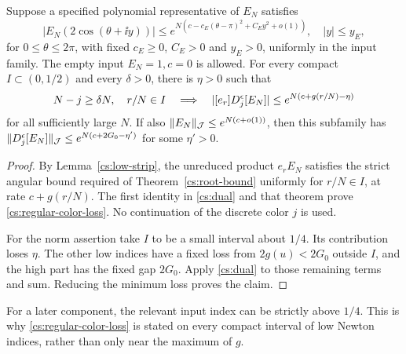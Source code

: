 \begin{proposition}\label{cs:regular-deficit}
Suppose a specified polynomial representative of $E_N$ satisfies
\begin{equation}\label{cs:E-strip}
 |E_N(2\cos(\theta+\ii y))|
 \le e^{N(c-c_E(\theta-\pi)^2+C_Ey^2+o(1))},
 \quad |y|\le y_E,
\end{equation}
for $0\le\theta\le2\pi$, with fixed $c_E\ge0$, $C_E>0$ and $y_E>0$, uniformly in the input family. The empty input \(E_N=1,c=0\) is allowed.
For every compact \(I\subset(0,1/2)\) and every \(\delta>0\),
there is \(\eta>0\) such that
\begin{equation}\label{cs:regular-color-loss}
 N-j\ge\delta N,\quad r/N\in I
 \quad\Longrightarrow\quad
 |[e_{r}]D_j^\epsilon[E_N]|
          \le e^{N(c+g(r/N)-\eta)}
\end{equation}
for all sufficiently large \(N\). If also
\(\lVert E_N\rVert_{\mathcal J}\le e^{N(c+o(1))}\), then this subfamily has
\(\lVert D_j^\epsilon[E_N]\rVert_{\mathcal J}\le e^{N(c+2G_0-\eta')}\)
for some \(\eta'>0\).
\end{proposition}
\begin{proof}
By Lemma~\ref{cs:low-strip}, the unreduced product $e_rE_N$ satisfies the strict angular bound required of Theorem~\ref{cs:root-bound}
uniformly for \(r/N\in I\), at rate \(c+g(r/N)\).
The first identity in \eqref{cs:dual} and that theorem prove
\eqref{cs:regular-color-loss}. No continuation of the discrete color
\(j\) is used.

For the norm assertion take \(I\) to be a small interval about
\(1/4\). Its contribution loses \(\eta\). The other low indices
have a fixed loss from \(2g(u)<2G_0\) outside \(I\), and the high
part has the fixed gap \(2G_0\). Apply \eqref{cs:dual} to those
remaining terms and sum. Reducing the minimum loss proves the claim.
\end{proof}

For a later component, the relevant input index can be strictly above
\(1/4\). This is why \eqref{cs:regular-color-loss} is stated on every
compact interval of low Newton indices, rather than only near the maximum of \(g\).
